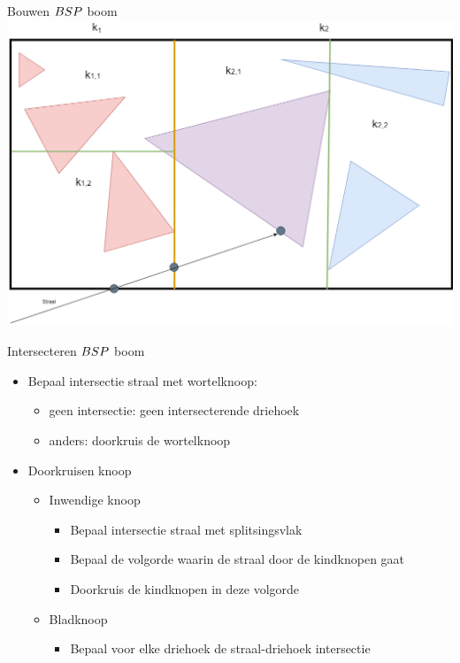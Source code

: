 \documentclass[11pt,t]{beamer}
\begin{document}
\begin{frame}[c]{Bouwen $BSP$ boom}
	\includegraphics[width=0.8\paperwidth]{../img/volumeSplitTraversal}
\end{frame}

\begin{frame}{Intersecteren $BSP$ boom}
	\begin{itemize}
		\item Bepaal intersectie straal met wortelknoop:
			\begin{itemize}
				\item geen intersectie: geen intersecterende driehoek
				\item anders: doorkruis de wortelknoop
			\end{itemize}
		\item Doorkruisen knoop 
			\begin{itemize}
				\item Inwendige knoop
					\begin{itemize}
						\item Bepaal intersectie straal met splitsingsvlak
						\item Bepaal de volgorde waarin de straal door de kindknopen gaat
						\item Doorkruis de kindknopen in deze volgorde
					\end{itemize}
				\item Bladknoop
					\begin{itemize}
						\item Bepaal voor elke driehoek de straal-driehoek intersectie
					\end{itemize}
			\end{itemize}
	\end{itemize}
\end{frame}
\end{document}
